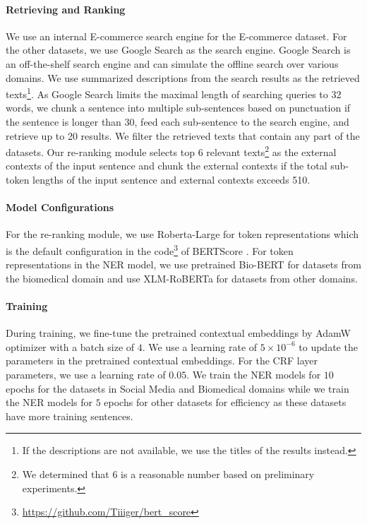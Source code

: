 \paragraph{Retrieving and Ranking} We use an internal E-commerce search engine for the E-commerce dataset. For the other datasets, we use Google Search as the search engine. Google Search is an off-the-shelf search engine and can simulate the offline search over various domains.
We use summarized descriptions from the search results as the retrieved texts\footnote{If the descriptions are not available, we use the titles of the results instead.}. As Google Search limits the maximal length of searching queries to 32 words, we chunk a sentence into multiple sub-sentences based on punctuation if the sentence is longer than 30, feed each sub-sentence to the search engine, and retrieve up to 20 results. We filter the retrieved texts that contain any part of the datasets. Our re-ranking module selects top $6$ relevant texts\footnote{We determined that $6$ is a reasonable number based on preliminary experiments.} as the external contexts of the input sentence and chunk the external contexts if the total sub-token lengths of the input sentence and external contexts exceeds 510.

\paragraph{Model Configurations}
For the re-ranking module, we use Roberta-Large \citep{liu2019roberta} for token representations which is the default configuration in the code\footnote{\url{https://github.com/Tiiiger/bert_score}} of BERTScore \citep{Zhang*2020BERTScore:}. For token representations in the NER model, we use pretrained Bio-BERT \citep{lee2020biobert} for datasets from the biomedical domain and use XLM-RoBERTa \citep{conneau-etal-2020-unsupervised} for datasets from other domains. %

\paragraph{Training} 
During training, we fine-tune the pretrained contextual embeddings by AdamW \citep{loshchilov2018decoupled} optimizer with a batch size of $4$. We use a learning rate of $5\times 10^{-6}$ to update the parameters in the pretrained contextual embeddings. For the CRF layer parameters, we use a learning rate of $0.05$. We train the NER models for $10$ epochs for the datasets in Social Media and Biomedical domains while we train the NER models for $5$ epochs for other datasets for efficiency as these datasets have more training sentences.

